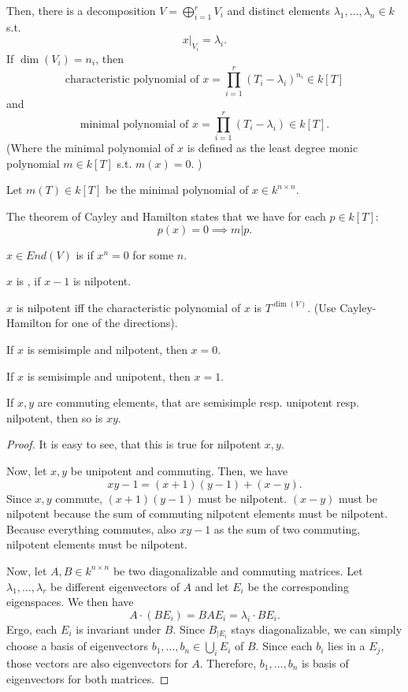 Then, there is a decomposition $V = \bigoplus_{i=1}^r V_i$ and distinct elements $\lambda_1, \ldots, \lambda_n \in k$ s.t.
\[ x|_{V_i} = \lambda_i. \]
If $\dim(V_i)= n_i$, then
\[ \text{characteristic polynomial of }x = \prod_{i=1}^r (T_i - \lambda_i)^{n_i} \in k[T] \]
and
\[ \text{minimal polynomial of }x = \prod_{i=1}^r (T_i - \lambda_i) \in k[T]. \]
(Where the minimal polynomial of $x$ is defined as the least degree monic polynomial $m \in k[T]$ s.t. $m(x) = 0$. )


\begin{remark}
	Let $m(T) \in k[T]$ be the minimal polynomial of $x \in k^{n\times n}$.
	
	The theorem of Cayley and Hamilton states that we have for each $p \in k[T]$:
	\[ p(x) = 0 \implies m | p. \]
\end{remark}

\begin{definition}
	$x \in End(V)$ is  if $x^n = 0$ for some $n$.

	$x$ is , if $x -1$ is nilpotent.
\end{definition}

\begin{lemma}
	$x$ is nilpotent iff the characteristic polynomial of $x$ is $T^{\dim(V)}$.
	(Use Cayley-Hamilton for one of the directions).
\end{lemma}

\begin{lemma}
	If $x$ is semisimple and nilpotent, then $x = 0$.
	
	If $x$ is semisimple and unipotent, then $x = 1$.
\end{lemma}
\begin{lemma}
	If $x,y$ are commuting elements, that are semisimple resp. unipotent resp. nilpotent, then so is $xy$.
\end{lemma}
\begin{proof}
	It is easy to see, that this is true for nilpotent $x,y$.
	
	Now, let $x,y$ be unipotent and commuting. Then, we have
	\[ xy - 1 = (x+1)(y-1) + (x-y). \]
	Since $x,y$ commute, $ (x+1)(y-1)$ must be nilpotent. $(x-y)$ must be nilpotent because the sum of commuting nilpotent elements must be nilpotent.
	Because everything commutes, also $xy-1$ as the sum of two commuting, nilpotent elements must be nilpotent.
	
	Now, let $A,B \in k^{n\times n}$ be two diagonalizable and commuting matrices. Let $\lambda_1,\ldots, \lambda_r$ be different eigenvectors of $A$ and let $E_i$ be the corresponding eigenspaces. We then have
	\[ A\cdot (B E_i) = BAE_i = \lambda_i \cdot BE_i. \]
	Ergo, each $E_i$ is invariant under $B$.
	Since $B_{|E_i}$ stays diagonalizable, we can simply choose a basis of eigenvectors $b_1,\ldots, b_n \in \bigcup_i E_i$ of $B$. Since each $b_i$ lies in a $E_j$, those vectors are also eigenvectors for $A$. Therefore, $b_1,\ldots,b_n$ is basis of eigenvectors for both matrices. 
\end{proof}

